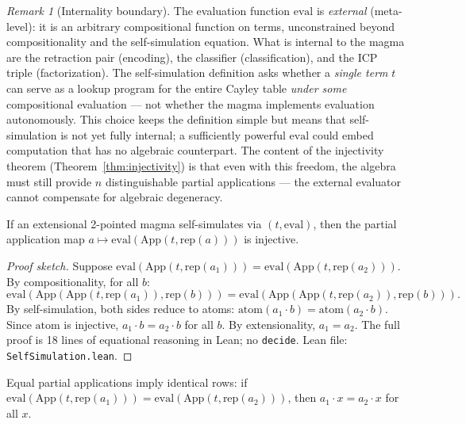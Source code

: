 \documentclass[sigconf,screen]{acmart}
\newcommand{\dotop}{\cdot}
\theoremstyle{remark}
\newtheorem{remark}{Remark}
\begin{document}
\begin{remark}[Internality boundary]
\label{rem:eval-external}
The evaluation function $\text{eval}$ is \emph{external} (meta-level): it is an arbitrary compositional function on terms, unconstrained beyond compositionality and the self-simulation equation. What is internal to the magma are the retraction pair (encoding), the classifier (classification), and the ICP triple (factorization). The self-simulation definition asks whether a \emph{single term} $t$ can serve as a lookup program for the entire Cayley table \emph{under some} compositional evaluation --- not whether the magma implements evaluation autonomously. This choice keeps the definition simple but means that self-simulation is not yet fully internal; a sufficiently powerful $\text{eval}$ could embed computation that has no algebraic counterpart. The content of the injectivity theorem (Theorem~\ref{thm:injectivity}) is that even with this freedom, the algebra must still provide $n$ distinguishable partial applications --- the external evaluator cannot compensate for algebraic degeneracy.
\end{remark}

\begin{theorem}
\label{thm:injectivity}
If an extensional 2-pointed magma self-simulates via $(t, \text{eval})$, then the partial application map $a \mapsto \text{eval}(\text{App}(t, \text{rep}(a)))$ is injective.
\end{theorem}

\begin{proof}[Proof sketch]
Suppose $\text{eval}(\text{App}(t, \text{rep}(a_1))) = \text{eval}(\text{App}(t, \text{rep}(a_2)))$. By compositionality, for all $b$:
\[
\text{eval}(\text{App}(\text{App}(t, \text{rep}(a_1)), \text{rep}(b))) = \text{eval}(\text{App}(\text{App}(t, \text{rep}(a_2)), \text{rep}(b))).
\]
By self-simulation, both sides reduce to atoms: $\text{atom}(a_1 \dotop b) = \text{atom}(a_2 \dotop b)$. Since $\text{atom}$ is injective, $a_1 \dotop b = a_2 \dotop b$ for all $b$. By extensionality, $a_1 = a_2$. The full proof is 18 lines of equational reasoning in Lean; no \texttt{decide}. Lean file: \texttt{SelfSimulation.lean}.
\end{proof}

\begin{corollary}[Discrimination]
\label{cor:discrimination}
Equal partial applications imply identical rows: if $\text{eval}(\text{App}(t, \text{rep}(a_1))) = \text{eval}(\text{App}(t, \text{rep}(a_2)))$, then $a_1 \dotop x = a_2 \dotop x$ for all $x$.
\end{corollary}
\end{document}
